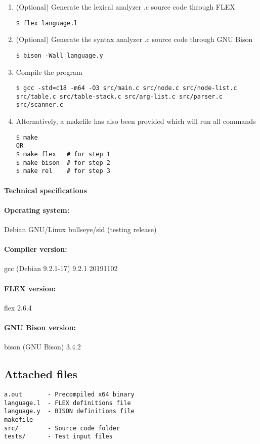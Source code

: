 \begin{enumerate}
\item (Optional) Generate the lexical analyzer .c source code through FLEX
\begin{lstlisting}
$ flex language.l
\end{lstlisting}

\item (Optional) Generate the syntax analyzer .c source code through GNU Bison
\begin{lstlisting}
$ bison -Wall language.y
\end{lstlisting}

\item Compile the program
\begin{lstlisting}
$ gcc -std=c18 -m64 -O3 src/main.c src/node.c src/node-list.c src/table.c src/table-stack.c src/arg-list.c src/parser.c src/scanner.c
\end{lstlisting}

\item Alternatively, a makefile has also been provided which will run all commands
\begin{lstlisting}
$ make
OR
$ make flex   # for step 1
$ make bison  # for step 2
$ make rel    # for step 3
\end{lstlisting}
\end{enumerate}

\paragraph{Technical specifications}
\paragraph{Operating system:} Debian GNU/Linux bullseye/sid (testing release)
\paragraph{Compiler version:} gcc (Debian 9.2.1-17) 9.2.1 20191102
\paragraph{FLEX version:} flex 2.6.4
\paragraph{GNU Bison version:} bison (GNU Bison) 3.4.2

\subsection{Attached files}
\begin{lstlisting}
a.out       - Precompiled x64 binary
language.l  - FLEX definitions file
language.y  - BISON definitions file
makefile    - 
src/        - Source code folder
tests/      - Test input files
\end{lstlisting}

